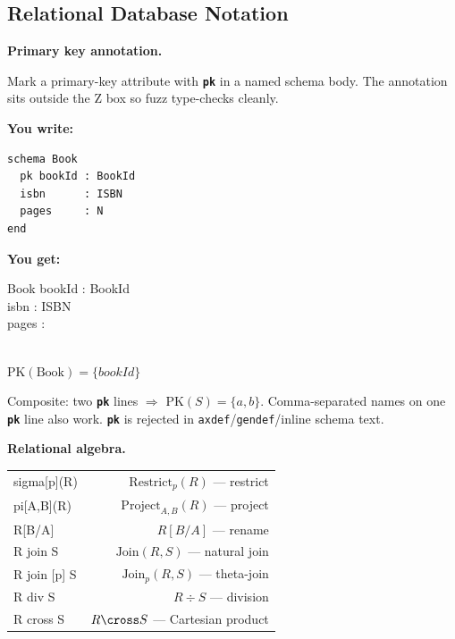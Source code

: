 \documentclass[10pt,landscape,a4paper]{article}
\newcommand{\kw}[1]{\texttt{\bfseries #1}}
\newenvironment{exwrite}%
  {\par\nobreak\noindent\scriptsize\textbf{You write:}\par\nobreak\vspace{0pt}\scriptsize}%
  {\vspace{1pt}\nobreak}
\newenvironment{exget}%
  {\par\nobreak\noindent\scriptsize\textbf{You get:}\par\nobreak\vspace{0pt}\small}%
  {\par\vspace{3pt}}
\begin{document}
\begin{multicols}{2}
\raggedcolumns

\section{Relational Database Notation}

\textbf{Primary key annotation.}

{\scriptsize Mark a primary-key attribute with \kw{pk} in a named schema body. The annotation sits outside the Z box so fuzz type-checks cleanly.}

\begin{exwrite}
\begin{verbatim}
schema Book
  pk bookId : BookId
  isbn      : ISBN
  pages     : N
end
\end{verbatim}
\end{exwrite}
\begin{exget}
\begin{center}
\begin{schema}{Book}
bookId : BookId \\
isbn : ISBN \\
pages : \nat
\end{schema}\\[2pt]
\noindent$\mathrm{PK}(\mathrm{Book}) = \{bookId\}$
\end{center}
\end{exget}

{\scriptsize Composite: two \kw{pk} lines $\Rightarrow$ $\mathrm{PK}(S)=\{a,b\}$.
Comma-separated names on one \kw{pk} line also work.
\kw{pk} is rejected in \texttt{axdef}/\texttt{gendef}/inline schema text.}

\smallskip
{}
\textbf{Relational algebra.}

\begin{tabularx}{\columnwidth}{LR}
sigma[p](R)          & $\mathrm{Restrict}_{p}(R)$ — restrict \\
pi[A,B](R)           & $\mathrm{Project}_{A,B}(R)$ — project \\
R[B/A]               & $R[B/A]$ — rename \\
R join S             & $\mathrm{Join}(R, S)$ — natural join \\
R join [p] S         & $\mathrm{Join}_{p}(R, S)$ — theta-join \\
R div S              & $R \div S$ — division \\
R cross S            & $R \cross S$ — Cartesian product \\
\end{tabularx}


\end{multicols}
\end{document}
